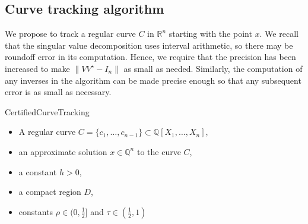 \subsection{Curve tracking algorithm}\label{sec:curve_tracking_algorithm}

We propose  to track a regular curve $C$ in $\mathbb{R}^n$ starting with the point $x$.  We recall that the singular value decomposition uses interval arithmetic, so there may be roundoff error in its computation.  Hence, we require that the precision has been increased to make $\|VV^\star- I_n\|$ as small as needed.  Similarly, the computation of any inverses in the algorithm can be made precise enough so that any subsequent error is as small as necessary.  


\begin{algorithm}[ht]
	\caption{CertifiedCurveTracking}
 \label{algo:certified_curve_tracking}
\begin{algorithmic}[1]
\Require  
\begin{itemize}
    \item A regular curve $C=\{c_1,\dots, c_{n-1}\}\subset\mathbb{Q}[X_1,\dots, X_n]$,
    \item an approximate solution $x\in\mathbb{Q}^n$ to the curve $C$,
    \item a constant $h>0$,
    \item a compact region $D$,
    \item constants $\rho\in(0,\frac{1}{2}]$ and $\tau\in(\frac{1}2,1)$
\end{itemize}
\label{line:6}
\label{line:rotate_back}
\label{line:unitary_transformation}
\end{algorithmic}
\end{algorithm}
